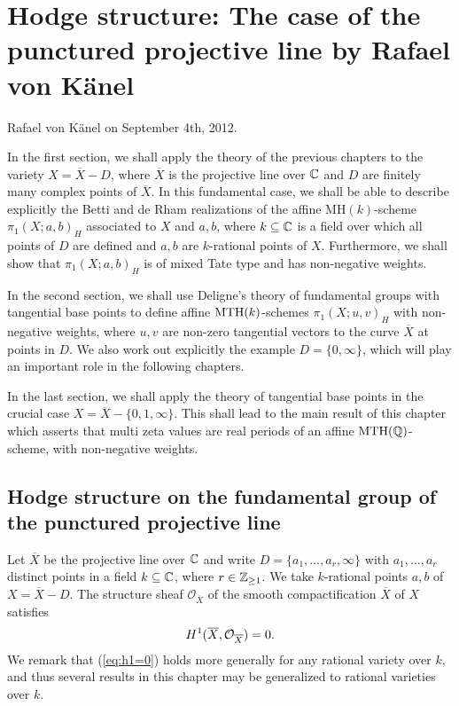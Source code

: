 \chapter{Hodge structure: The case of the punctured projective line by Rafael von K\"anel}

Rafael von K\"anel on September 4th, 2012.

\medskip
\medskip

\noindent In the first section, we shall apply the theory of the previous chapters to the variety $X=\overline{X}-D$, where $\overline{X}$ is the projective line over $\mathbb{C}$ and $D$ are finitely many complex points of $\overline{X}$. 
In this fundamental case, we shall be able to describe explicitly the Betti and de Rham realizations of the affine $\mathrm{MH}(k)$-scheme $\pi_1(X;a,b)_H$ associated to $X$ and $a,b$, where $k\subseteq \mathbb {\mathbb{C}}$ is a field over which all points of $D$ are defined  and  $a,b$ are $k$-rational points of $X$. Furthermore, we shall show that $\pi_1(X;a,b)_H$ is of mixed Tate type and has non-negative weights.


In the second section, we shall use Deligne's theory of fundamental groups with tangential base points to define affine $\mathrm{MTH}(k)$-schemes $\pi_1(X;u,v)_H$ with non-negative weights, where $u,v$ are non-zero tangential vectors to the curve $\overline{X}$ at points in $D$. We also work out explicitly the example $D=\{0,\infty\}$, which will play an important role in the following chapters.

In the last section, we shall apply the theory of tangential base points in the crucial case $X=\overline{X}-\{0,1,\infty\}$. This shall lead to the main result of this chapter which asserts that multi zeta values are real periods of an affine $\mathrm{MTH}(\mathbb{Q})$-scheme, with non-negative weights.


\section{Hodge structure on the fundamental group of the punctured projective line}\label{sec:hodgepuncteredpline}

Let $\overline{X}$ be the projective line over $\mathbb{C}$ and write $D=\{a_1,\dotsc,a_r,\infty\}$ with $a_1,\dotsc,a_r$ distinct points in a field $k\subseteq \mathbb{C}$, where $r\in \mathbb{Z}_{\geq 1}$. We take $k$-rational points $a,b$ of $X=\overline{X}-D$. The structure sheaf $\mathcal O_{\overline{X}}$ of the smooth compactification $\overline{X}$ of $X$ satisfies  
\begin{equation}\label{eq:h1=0}
H^1(\overline{X},\mathcal{O}_{\overline{X}})=0.
\end{equation}
We remark that (\ref{eq:h1=0}) holds more generally for any rational variety over $k$, and thus several results in this chapter may be generalized to rational varieties over $k$.

